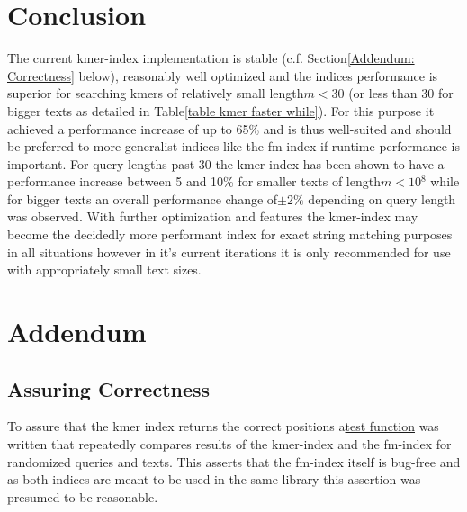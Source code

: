 \chapter{Conclusion}

The current kmer-index implementation is stable (c.f. Section\ref{Addendum: Correctness}
below), reasonably well optimized and the indices performance is superior
for searching kmers of relatively small length$m<30$ (or less than
30 for bigger texts as detailed in Table\ref{table kmer faster while}).
For this purpose it achieved a performance increase of up to 65\%
and is thus well-suited and should be preferred to more generalist
indices like the fm-index if runtime performance is important. For
query lengths past 30 the kmer-index has been shown to have a performance
increase between 5 and 10\% for smaller texts of length$m<10{{}^8}$
while for bigger texts an overall performance change of$\pm2\%$ depending
on query length was observed. With further optimization and features
the kmer-index may become the decidedly more performant index for
exact string matching purposes in all situations however in it's current
iterations it is only recommended for use with appropriately small
text sizes.

\newpage{}

\chapter{Addendum}

\section{\label{Addendum: Correctness}Assuring Correctness}

To assure that the kmer index returns the correct positions a\href{https://github.com/google/googletest}{test function}
was written that repeatedly compares results of the kmer-index and
the fm-index for randomized queries and texts. This asserts that the
fm-index itself is bug-free and as both indices are meant to be used
in the same library this assertion was presumed to be reasonable.

